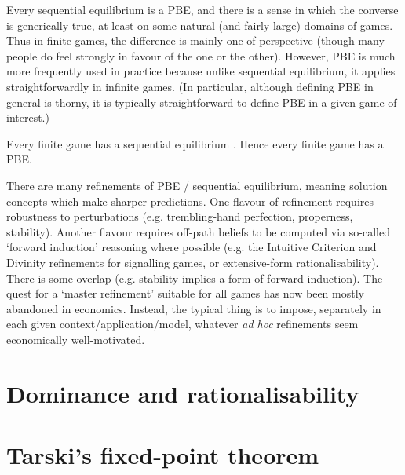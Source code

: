 \documentclass[11pt,letterpaper,reqno,oneside]{book}
\begin{document}
Every sequential equilibrium is a PBE, and there is a sense in which the converse is generically true, at least on some natural (and fairly large) domains of games. Thus in finite games, the difference is mainly one of perspective (though many people do feel strongly in favour of the one or the other). However, PBE is much more frequently used in practice because unlike sequential equilibrium, it applies straightforwardly in infinite games. (In particular, although defining PBE in general is thorny, it is typically straightforward to define PBE in a given game of interest.)

Every finite game has a sequential equilibrium \parencite{KrepsWilson1982}. Hence every finite game has a PBE.

There are many refinements of PBE / sequential equilibrium, meaning solution concepts which make sharper predictions. One flavour of refinement requires robustness to perturbations (e.g. trembling-hand perfection, properness, stability). Another flavour requires off-path beliefs to be computed via so-called `forward induction' reasoning where possible (e.g. the Intuitive Criterion and Divinity refinements for signalling games, or extensive-form rationalisability). There is some overlap (e.g. stability implies a form of forward induction). The quest for a `master refinement' suitable for all games has now been mostly abandoned in economics. Instead, the typical thing is to impose, separately in each given context/application/model, whatever \emph{ad hoc} refinements seem economically well-motivated.



\chapter{Dominance and rationalisability}
\label{ch_dom}





\chapter{Tarski's fixed-point theorem}
\label{ch_tar}


\end{document}
